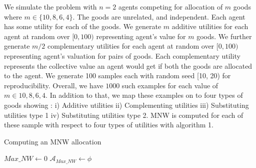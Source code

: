 We simulate the problem with $n = 2$ agents competing for allocation of $m$ goods where $m \in \{10, 8, 6, 4\}$. The goods are unrelated, and independent. Each agent has some utility for each of the goods. We generate $m$ additive utilities for each agent at random over $[0, 100)$ representing agent's value for $m$ goods. We further generate $m/2$ complementary utilities for each agent at random over $[0, 100)$ representing agent's valuation for pairs of goods. Each complementary utility represents the collective value an agent would get if both the goods are allocated to the agent. We generate 100 samples each with random seed [10, 20) for reproducibility. Overall, we have $1000$ such examples for each value of $m \in {10, 8, 6, 4}$. In addition to that, we map these examples on to four types of goods showing : i) Additive utilities ii) Complementing utilities iii) Substituting utilities type 1 iv) Substituting utilities type 2.  MNW is computed for each of these sample with respect to four types of utilities with algorithm 1.

\BlankLine

\begin{algorithm}
\caption{ Computing an MNW allocation }
\SetAlgoLined
{}
 $Max\_NW \leftarrow 0 $ \;
 $\mathcal{A}_{Max\_NW} \leftarrow \phi $ \;
\end{algorithm}

